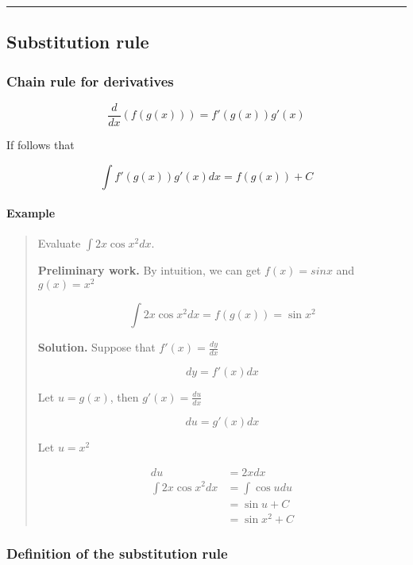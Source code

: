 \documentclass[
]{article}
\begin{document}
\begin{center}\rule{0.5\linewidth}{0.5pt}\end{center}

\hypertarget{substitution-rule}{%
\subsection{Substitution rule}\label{substitution-rule}}

\hypertarget{chain-rule-for-derivatives}{%
\subsubsection{Chain rule for
derivatives}\label{chain-rule-for-derivatives}}

\[ \frac{d}{dx}(f(g(x)))=f'(g(x))g'(x) \]

If follows that

\[ \int f'(g(x))g'(x)dx = f(g(x))+C \]

\hypertarget{example-2}{%
\paragraph*{Example}\label{example-2}}

\begin{quote}
Evaluate \(\int 2x\cos x^2dx\).

\textbf{Preliminary work.} By intuition, we can get \(f(x)=sinx\) and
\(g(x)=x^2\)

\[ \int 2x\cos x^2dx = f(g(x)) = \sin x^2 \]

\textbf{Solution.} Suppose that \(f'(x)=\frac{dy}{dx}\)

\[ dy = f'(x)dx \]

Let \(u=g(x)\), then \(g'(x)=\frac{du}{dx}\)

\[ du = g'(x)dx \]

Let \(u=x^2\)

\begin{align*}
du &=2xdx\\
 \int 2x\cos x^2dx &= \int \cos udu\\
 &=\sin u+C \\
 &=\sin x^2+C
\end{align*}
\end{quote}

\hypertarget{definition-of-the-substitution-rule}{%
\subsubsection{Definition of the substitution
rule}\label{definition-of-the-substitution-rule}}
\end{document}
